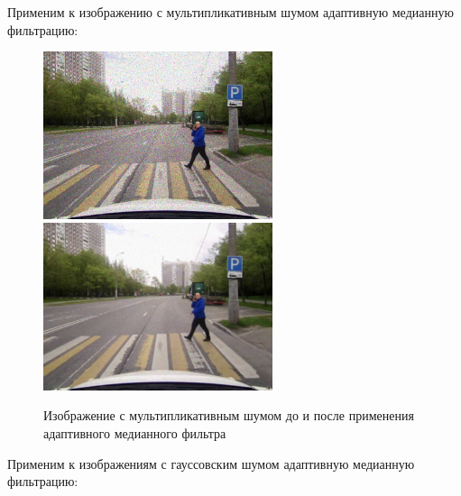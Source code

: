 \pagebreak
Применим к изображению с мультипликативным шумом адаптивную медианную фильтрацию:

\begin{figure}[hbt!]
    \centering
    \includegraphics[width=0.6\textwidth]{../outputs/image_mltp_noise.png}
    \includegraphics[width=0.6\textwidth]{../outputs/image_quant_filter.png}
    \caption{Изображение с мультипликативным шумом до и после применения адаптивного медианного фильтра}
    \label{fig:stich_images}
\end{figure}

\pagebreak
Применим к изображениям с гауссовским шумом адаптивную медианную фильтрацию:

